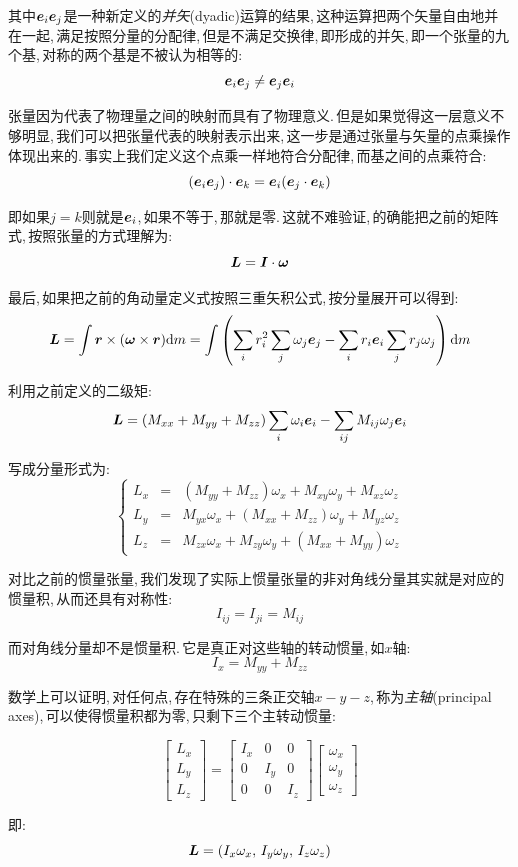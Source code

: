 其中$\boldsymbol{e}_i\boldsymbol{e}_j$是一种新定义的\emph{并矢}(dyadic)运算的结果,\,这种运算把两个矢量自由地并在一起,\,满足按照分量的分配律,\,但是不满足交换律,\,即形成的并矢,\,即一个张量的九个基,\,对称的两个基是不被认为相等的:
\[\boldsymbol{e}_i\boldsymbol{e}_j\neq \boldsymbol{e}_j\boldsymbol{e}_i\]

张量因为代表了物理量之间的映射而具有了物理意义.\,但是如果觉得这一层意义不够明显,\,我们可以把张量代表的映射表示出来,\,这一步是通过张量与矢量的点乘操作体现出来的.\,事实上我们定义这个点乘一样地符合分配律,\,而基之间的点乘符合:
\[(\boldsymbol{e}_i\boldsymbol{e}_j)\cdot \boldsymbol{e}_k=\boldsymbol{e}_i(\boldsymbol{e}_j\cdot \boldsymbol{e}_k)\]

即如果$j=k$则就是$\boldsymbol{e}_i$,\,如果不等于,\,那就是零.\,这就不难验证,\,的确能把之前的矩阵式,\,按照张量的方式理解为:
\[\boldsymbol{L}=\boldsymbol{I}\cdot\boldsymbol{\omega}\]

最后,\,如果把之前的角动量定义式按照三重矢积公式,\,按分量展开可以得到:
\[\boldsymbol{L}=\int \boldsymbol{r}\times(\boldsymbol{\omega}\times \boldsymbol{r})\textrm{d} m=\int \left(\sum_i r_i^2 \sum_j \omega_j \boldsymbol{e}_j-\sum_i r_i \boldsymbol{e}_i\sum_j r_j\omega_j \right)\textrm{d} m\]

利用之前定义的二级矩:
\[\boldsymbol{L}=(M_{xx}+M_{yy}+M_{zz})\sum_i \omega_i \boldsymbol{e}_i-\sum_{ij}M_{ij}\omega_j\boldsymbol{e}_i\]

写成分量形式为:
\[\left\{\begin{array}{ccc}L_x &=&(M_{yy}+M_{zz})\omega_x+M_{xy}\omega_y+M_{xz}\omega_z\\L_y &=& M_{yx}\omega_x+(M_{xx}+M_{zz})\omega_y+M_{yz}\omega_z\\L_z &=& M_{zx}\omega_x+M_{zy}\omega_y+(M_{xx}+M_{yy})\omega_z\end{array}\right.\]

对比之前的惯量张量,\,我们发现了实际上惯量张量的非对角线分量其实就是对应的惯量积,\,从而还具有对称性:
\[I_{ij}=I_{ji}=M_{ij}\]

而对角线分量却不是惯量积.\,它是真正对这些轴的转动惯量,\,如$x$轴:
\[I_x=M_{yy}+M_{zz}\]

数学上可以证明,\,对任何点,\,存在特殊的三条正交轴$x-y-z$,\,称为\emph{主轴}(principal axes),\,可以使得惯量积都为零,\,只剩下三个主转动惯量:

\[\begin{bmatrix}L_{x}\\L_{y}\\L_{z}\end{bmatrix}=\begin{bmatrix}I_{x}&0&0\\0&I_{y}&0\\0&0&I_{z}\end{bmatrix}\begin{bmatrix}\omega_{x}\\\omega_{y}\\\omega_{z}\end{bmatrix}\]

即:
\[\boldsymbol{L}=(I_x\omega_x,\,I_y\omega_y,\,I_z\omega_z)\]

